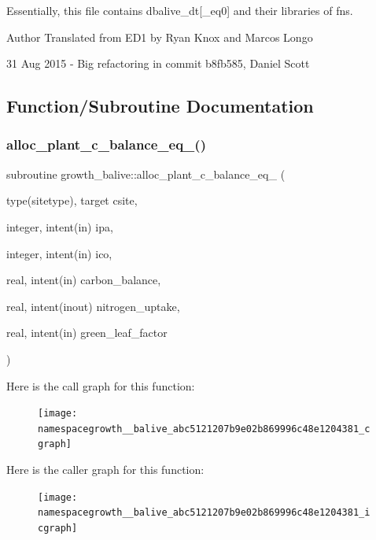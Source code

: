 Essentially, this file contains dbalive\+\_\+dt\mbox{[}\+\_\+eq0\mbox{]} and their libraries of fns. \begin{DoxyAuthor}{Author}
Translated from E\+D1 by Ryan Knox and Marcos Longo 

31 Aug 2015 -\/ Big refactoring in commit b8fb585, Daniel Scott 
\end{DoxyAuthor}


\subsection{Function/\+Subroutine Documentation}
\mbox{\label{namespacegrowth__balive_abc5121207b9e02b869996c48e1204381}} 
\subsubsection{\texorpdfstring{alloc\+\_\+plant\+\_\+c\+\_\+balance\+\_\+eq\+\_()}{alloc\_plant\_c\_balance\_eq\_0()}}
{\footnotesize\ttfamily subroutine growth\+\_\+balive\+::alloc\+\_\+plant\+\_\+c\+\_\+balance\+\_\+eq\+\_ (\begin{DoxyParamCaption}\item[{type(sitetype), target}]{csite,  }\item[{integer, intent(in)}]{ipa,  }\item[{integer, intent(in)}]{ico,  }\item[{real, intent(in)}]{carbon\+\_\+balance,  }\item[{real, intent(inout)}]{nitrogen\+\_\+uptake,  }\item[{real, intent(in)}]{green\+\_\+leaf\+\_\+factor }\end{DoxyParamCaption})}

Here is the call graph for this function\+:
\nopagebreak
\begin{figure}[H]
\begin{center}
\leavevmode
\texttt{[image: namespacegrowth\_\_balive\_abc5121207b9e02b869996c48e1204381\_cgraph]}
\end{center}
\end{figure}
Here is the caller graph for this function\+:
\nopagebreak
\begin{figure}[H]
\begin{center}
\leavevmode
\texttt{[image: namespacegrowth\_\_balive\_abc5121207b9e02b869996c48e1204381\_icgraph]}
\end{center}
\end{figure}
\mbox{\label{namespacegrowth__balive_aade95a53fd0d26aabf864afab17b1889}} 
